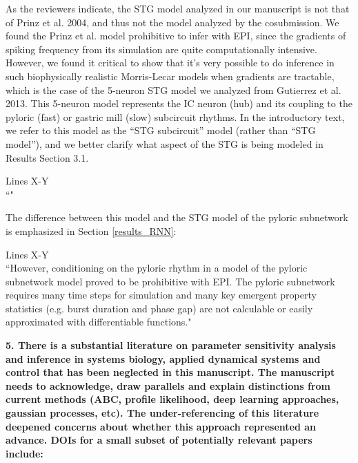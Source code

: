 \documentclass[11pt,a4paper]{article}
\begin{document}
As the reviewers indicate, the STG model analyzed in our manuscript is not that of Prinz et al. 2004, and thus not the model analyzed by the cosubmission.  We found the Prinz et al. model prohibitive to infer with EPI, since the gradients of spiking frequency from its simulation are quite computationally intensive.  However, we found it critical to show that it’s very possible to do inference in such biophysically realistic Morris-Lecar models when gradients are tractable, which is the case of the 5-neuron STG model we analyzed from Gutierrez et al. 2013.  This 5-neuron model represents the IC neuron (hub) and its coupling to the pyloric (fast) or gastric mill (slow) subcircuit rhythms.  In the introductory text, we refer to this model as the “STG subcircuit” model (rather than “STG model”), and we better clarify what aspect of the STG is being modeled in Results Section 3.1. 

\begin{displayquote}
Lines X-Y \\
``"
\end{displayquote}

The difference between this model and the STG model of the pyloric subnetwork is emphasized in Section \ref{results_RNN}:

\begin{displayquote}
Lines X-Y \\
``However, conditioning on the pyloric rhythm \cite{marder1992dynamic} in a model of the pyloric subnetwork model \cite{prinz2004similar} proved to be prohibitive with EPI.
The pyloric subnetwork requires many time steps for simulation and many key emergent property statistics (e.g. burst duration and phase gap) are not calculable or easily approximated with differentiable functions."
\end{displayquote}

\textbf{5. There is a substantial literature on parameter sensitivity analysis and inference in systems biology, applied dynamical systems and control that has been neglected in this manuscript. The manuscript needs to acknowledge, draw parallels and explain distinctions from current methods (ABC, profile likelihood, deep learning approaches, gaussian processes, etc). The under-referencing of this literature deepened concerns about whether this approach represented an advance. DOIs for a small subset of potentially relevant papers include:}
\end{document}
